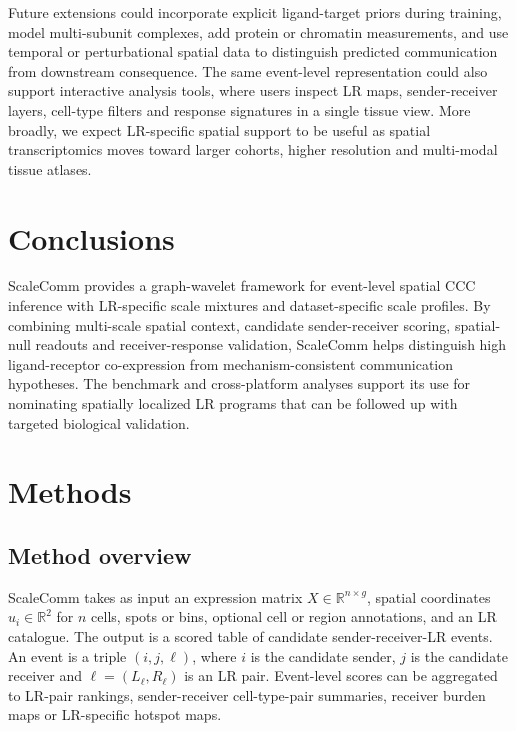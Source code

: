 \documentclass[referee,lineno,pdflatex,sn-vancouver-num]{sn-jnl}
\begin{document}
Future extensions could incorporate explicit ligand-target priors during training, model multi-subunit complexes, add protein or chromatin measurements, and use temporal or perturbational spatial data to distinguish predicted communication from downstream consequence. The same event-level representation could also support interactive analysis tools, where users inspect LR maps, sender-receiver layers, cell-type filters and response signatures in a single tissue view. More broadly, we expect LR-specific spatial support to be useful as spatial transcriptomics moves toward larger cohorts, higher resolution and multi-modal tissue atlases.

\section{Conclusions}\label{sec:conclusions}

ScaleComm provides a graph-wavelet framework for event-level spatial CCC inference with LR-specific scale mixtures and dataset-specific scale profiles. By combining multi-scale spatial context, candidate sender-receiver scoring, spatial-null readouts and receiver-response validation, ScaleComm helps distinguish high ligand-receptor co-expression from mechanism-consistent communication hypotheses. The benchmark and cross-platform analyses support its use for nominating spatially localized LR programs that can be followed up with targeted biological validation.

\section{Methods}\label{sec:methods}

\subsection{Method overview}

ScaleComm takes as input an expression matrix $X \in \mathbb{R}^{n \times g}$, spatial coordinates $u_i \in \mathbb{R}^2$ for $n$ cells, spots or bins, optional cell or region annotations, and an LR catalogue. The output is a scored table of candidate sender-receiver-LR events. An event is a triple $(i,j,\ell)$, where $i$ is the candidate sender, $j$ is the candidate receiver and $\ell=(L_\ell,R_\ell)$ is an LR pair. Event-level scores can be aggregated to LR-pair rankings, sender-receiver cell-type-pair summaries, receiver burden maps or LR-specific hotspot maps.
\end{document}

